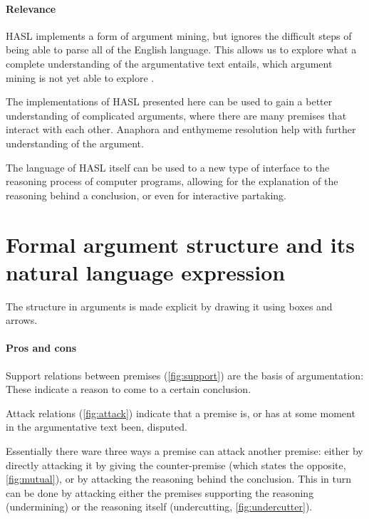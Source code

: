 \documentclass{IOS-Book-Article}
\begin{document}
\paragraph{Relevance}
HASL implements a form of argument mining, but ignores the difficult steps of being able to parse all of the English language. This allows us to explore what a complete understanding of the argumentative text entails, which argument mining is not yet able to explore \cite{stabGurevych2017}.

The implementations of HASL presented here can be used to gain a better understanding of complicated arguments, where there are many premises that interact with each other. Anaphora and enthymeme resolution help with further understanding of the argument.

The language of HASL itself can be used to a new type of interface to the reasoning process of computer programs, allowing for the explanation of the reasoning behind a conclusion, or even for interactive partaking.

\section{Formal argument structure and its natural language expression}
The structure in arguments is made explicit by drawing it using boxes and arrows.

\paragraph{Pros and cons} 

Support relations between premises (\autoref{fig:support}) are the basis of argumentation: These indicate a reason to come to a certain conclusion.

Attack relations (\autoref{fig:attack}) indicate that a premise is, or has at some moment in the argumentative text been, disputed.

Essentially there ware three ways a premise can attack another premise: either by directly attacking it by giving the counter-premise (which states the opposite, \autoref{fig:mutual}), or by attacking the reasoning behind the conclusion. This in turn can be done by attacking either the premises supporting the reasoning (undermining) or the reasoning itself (undercutting, \autoref{fig:undercutter}).
\end{document}
